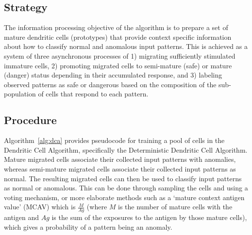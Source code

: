 \subsection{Strategy}
The information processing objective of the algorithm is to prepare a set of mature dendritic cells (prototypes) that provide context specific information about how to classify normal and anomalous input patterns.
This is achieved as a system of three asynchronous processes of 1) migrating sufficiently stimulated immature cells, 2) promoting migrated cells to semi-mature (safe) or mature (danger) status depending in their accumulated response, and 3) labeling observed patterns as safe or dangerous based on the composition of the sub-population of cells that respond to each pattern.

\subsection{Procedure}
Algorithm~\ref{alg:dca} provides pseudocode for training a pool of cells in the Dendritic Cell Algorithm, specifically the Deterministic Dendritic Cell Algorithm. Mature migrated cells associate their collected input patterns with anomalies, whereas semi-mature migrated cells associate their collected input patterns as normal.
The resulting migrated cells can then be used to classify input patterns as normal or anomalous. This can be done through sampling the cells and using a voting mechanism, or more elaborate methods such as a `mature context antigen value' (MCAV) which is $\frac{M}{Ag}$ (where $M$ is the number of mature cells with the antigen and $Ag$ is the sum of the exposures to the antigen by those mature cells), which gives a probability of a pattern being an anomaly.

